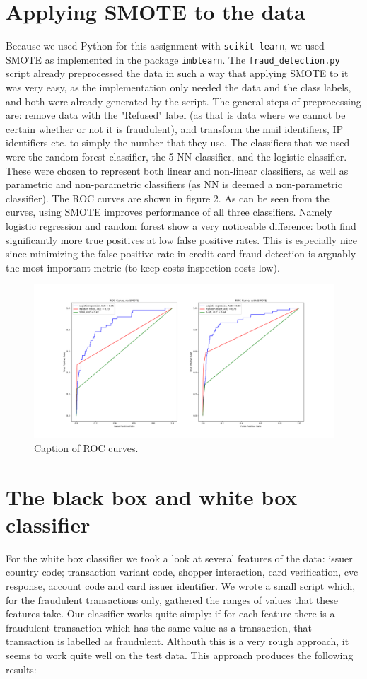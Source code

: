 \documentclass[]{article}
\begin{document}
\section{Applying SMOTE to the data}
Because we used Python for this assignment with \texttt{scikit-learn}, we used SMOTE as implemented in the package \texttt{imblearn}. The \texttt{fraud\_detection.py} script already preprocessed the data in such a way that applying SMOTE to it was very easy, as the implementation only needed the data and the class labels, and both were already generated by the script. The general steps of preprocessing are: remove data with the "Refused" label (as that is data where we cannot be certain whether or not it is fraudulent), and transform the mail identifiers, IP identifiers etc. to simply the number that they use. The classifiers that we used were the random forest classifier, the 5-NN classifier, and the logistic classifier. These were chosen to represent both linear and non-linear classifiers, as well as parametric and non-parametric classifiers (as NN is deemed a non-parametric classifier). The ROC curves are shown in figure 2. As can be seen from the curves, using SMOTE improves performance of all three classifiers. Namely logistic regression and random forest show a very noticeable difference: both find significantly more true positives at low false positive rates. This is especially nice since minimizing the false positive rate in credit-card fraud detection is arguably the most important metric (to keep costs inspection costs low).   
\begin{figure}[h!]
	\centering
	\includegraphics[scale = 0.3]{Visualizations/ROC_curves}
	\caption{Caption of ROC curves.}
\end{figure}
\clearpage
\section{The black box and white box classifier}
For the white box classifier we took a look at several features of the data: issuer country code; transaction variant code, shopper interaction, card verification, cvc response, account code and card issuer identifier. We wrote a small script which, for the fraudulent transactions only, gathered the ranges of values that these features take. Our classifier works quite simply: if for each feature there is a fraudulent transaction which has the same value as a transaction, that transaction is labelled as fraudulent. Althouth this is a very rough approach, it seems to work quite well on the test data. This approach produces the following results:
\end{document}
